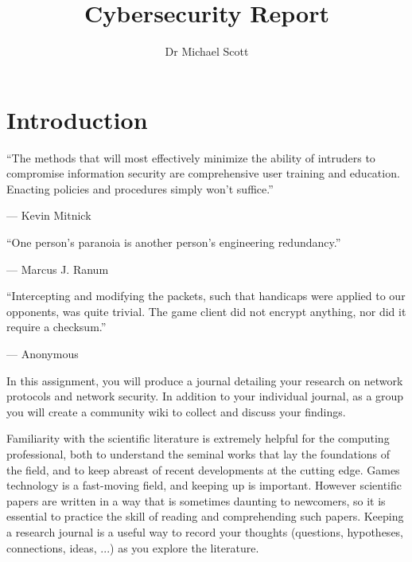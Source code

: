 \documentclass{../../fal_assignment}
\title{Cybersecurity Report}
\author{Dr Michael Scott}
\begin{document}
\maketitle

\section*{Introduction}

\begin{marginquote}
  ``The methods that will most effectively minimize the ability of intruders to compromise information security are comprehensive user training and education. Enacting policies and procedures simply won't suffice.''
    
    --- Kevin Mitnick
    
    \marginquoterule
    
    ``One person's paranoia is another person's engineering redundancy.''
    
    --- Marcus J. Ranum
    
    \marginquoterule

        ``Intercepting and modifying the packets, such that handicaps were applied to our opponents, was quite trivial. The game client did not encrypt anything, nor did it require a checksum.''
    
    --- Anonymous
            
\end{marginquote}

In this assignment, you will produce a journal detailing your research on network protocols and network security. In addition to your individual journal, as a group you will create a community wiki to collect and discuss your findings.

Familiarity with the scientific literature is extremely helpful for the computing professional,
both to understand the seminal works that lay the foundations of the field,
and to keep abreast of recent developments at the cutting edge.
Games technology is a fast-moving field, and keeping up is important.
However scientific papers are written in a way that is sometimes daunting to newcomers,
so it is essential to practice the skill of reading and comprehending such papers.
Keeping a research journal is a useful way to record your thoughts
(questions, hypotheses, connections, ideas, ...) as you explore the literature.
\end{document}
